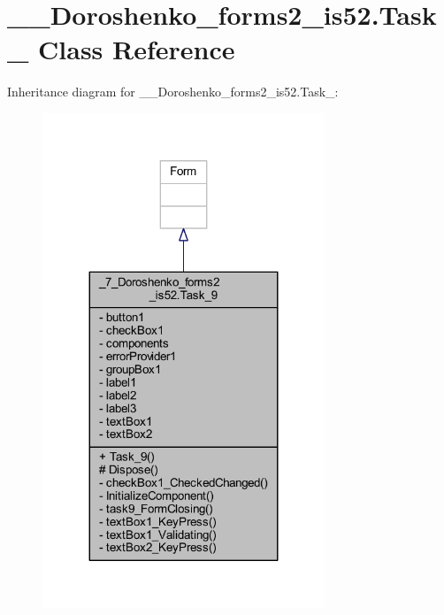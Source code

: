 \hypertarget{class__7___doroshenko__forms2__is52_1_1_task__9}{}\section{\+\_\+\_\+\+Doroshenko\+\_\+forms2\+\_\+is52.\+Task\+\_ Class Reference}
\label{class__7___doroshenko__forms2__is52_1_1_task__9}


Inheritance diagram for \+\_\+\_\+\+Doroshenko\+\_\+forms2\+\_\+is52.\+Task\+\_\+:
\nopagebreak
\begin{figure}[H]
\begin{center}
\leavevmode
\includegraphics[width=239pt]{class__7___doroshenko__forms2__is52_1_1_task__9__inherit__graph}
\end{center}
\end{figure}


